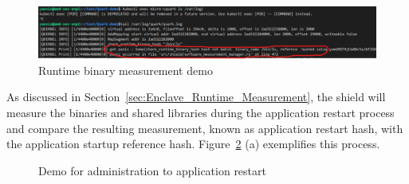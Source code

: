 \begin{figure}[!htb]
    \centering
    \includegraphics[width=1\textwidth]{images/cquark_runtime_runtime_binary_measurement_demo.png}
    \caption[Runtime binary measurement demo]{Runtime binary measurement demo}
    \label{fig:cquark_runtime_runtime_binary_measurement_demo}
\end{figure}



As discussed in Section~\ref{sec:Enclave_Runtime_Measurement}, the shield will measure the binaries and shared libraries during the application restart process and compare the resulting measurement, known as application restart hash, with the application startup reference hash. 
Figure~\ref{fig:cquark_application_restart_demo} (a) exemplifies this process.
\begin{figure}[!htb]

  
    \caption[Demo for  administration to application restart]{Demo for administration to application restart}
    \label{fig:cquark_application_restart_demo}
\end{figure}

